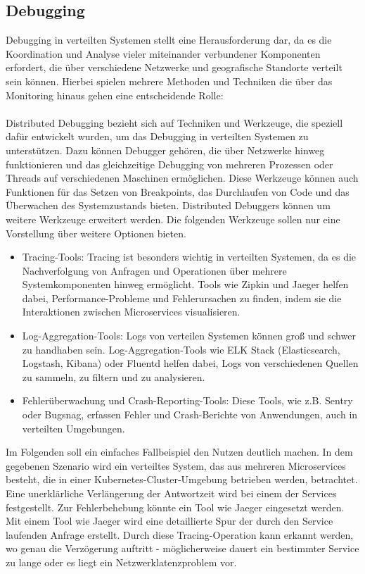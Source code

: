 \subsection{Debugging}

Debugging in verteilten Systemen stellt eine Herausforderung dar, da es die Koordination und Analyse vieler miteinander verbundener Komponenten erfordert, die über verschiedene Netzwerke und geografische Standorte verteilt sein können. Hierbei spielen mehrere Methoden und Techniken die über das Monitoring hinaus gehen eine entscheidende Rolle:
\\\\
Distributed Debugging bezieht sich auf Techniken und Werkzeuge, die speziell dafür entwickelt wurden, um das Debugging in verteilten Systemen zu unterstützen. Dazu können Debugger gehören, die über Netzwerke hinweg funktionieren und das gleichzeitige Debugging von mehreren Prozessen oder Threads auf verschiedenen Maschinen ermöglichen. Diese Werkzeuge können auch Funktionen für das Setzen von Breakpoints, das Durchlaufen von Code und das Überwachen des Systemzustands bieten. Distributed Debuggers können um weitere Werkzeuge erweitert werden. Die folgenden Werkzeuge sollen nur eine Vorstellung über weitere Optionen bieten.
\begin{itemize}
\item Tracing-Tools: Tracing ist besonders wichtig in verteilten Systemen, da es die Nachverfolgung von Anfragen und Operationen über mehrere Systemkomponenten hinweg ermöglicht. Tools wie Zipkin und Jaeger helfen dabei, Performance-Probleme und Fehlerursachen zu finden, indem sie die Interaktionen zwischen Microservices visualisieren.
\item Log-Aggregation-Tools: Logs von verteilen Systemen können groß und schwer zu handhaben sein. Log-Aggregation-Tools wie ELK Stack (Elasticsearch, Logstash, Kibana) oder Fluentd helfen dabei, Logs von verschiedenen Quellen zu sammeln, zu filtern und zu analysieren.
\item Fehlerüberwachung und Crash-Reporting-Tools: Diese Tools, wie z.B. Sentry oder Bugsnag, erfassen Fehler und Crash-Berichte von Anwendungen, auch in verteilten Umgebungen.
\end{itemize}
Im Folgenden soll ein einfaches Fallbeispiel den Nutzen deutlich machen. In dem gegebenen Szenario wird ein verteiltes System, das aus mehreren Microservices besteht, die in einer Kubernetes-Cluster-Umgebung betrieben werden, betrachtet. Eine unerklärliche Verlängerung der Antwortzeit wird bei einem der Services festgestellt. Zur Fehlerbehebung könnte ein Tool wie Jaeger eingesetzt werden. Mit einem Tool wie Jaeger wird eine detaillierte Spur der durch den Service laufenden Anfrage erstellt. Durch diese Tracing-Operation kann erkannt werden, wo genau die Verzögerung auftritt - möglicherweise dauert ein bestimmter Service zu lange oder es liegt ein Netzwerklatenzproblem vor.
